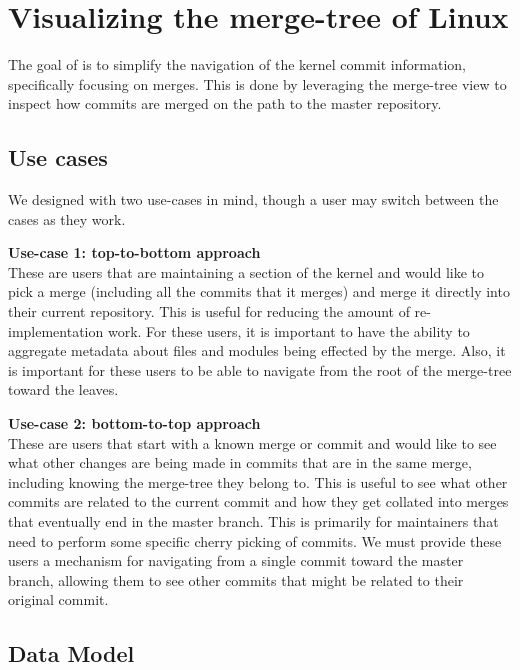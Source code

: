 \documentclass[conference, draftclsnofoot, draft]{IEEEtran}
\begin{document}
\section{Visualizing the merge-tree of Linux}

The goal of \tool is to simplify the navigation of the kernel commit information,
specifically focusing on merges. This is done by leveraging the merge-tree view to
inspect how commits are merged on the path to the master repository.

\subsection{Use cases}

We designed \tool with two use-cases in mind, though a user may switch between the
cases as they work.

\noindent \textbf{Use-case 1: top-to-bottom approach}\label{sec:usecase1}\\ These
are users that are maintaining a section of the kernel and would like to pick a
merge (including all the commits that it merges) and merge it directly into their
current repository. This is useful for reducing the amount of re-implementation
work. For these users, it is important to have the ability to aggregate metadata
about files and modules being effected by the merge. Also, it is important for these
users to be able to navigate from the root of the merge-tree toward the leaves.

\noindent \textbf{Use-case 2: bottom-to-top approach}\label{sec:usecase2}\\
These are users that start with a known merge or commit and would like to see what
other changes are being made in commits that are in the same merge, including
knowing the merge-tree they belong to. This is useful to see what other commits are
related to the current commit and how they get collated into merges that eventually
end in the master branch. This is primarily for maintainers that need to perform
some specific cherry picking of commits. We must provide these users a mechanism for
navigating from a single commit toward the master branch, allowing them to see other
commits that might be related to their original commit.

\subsection{Data Model}
\end{document}

